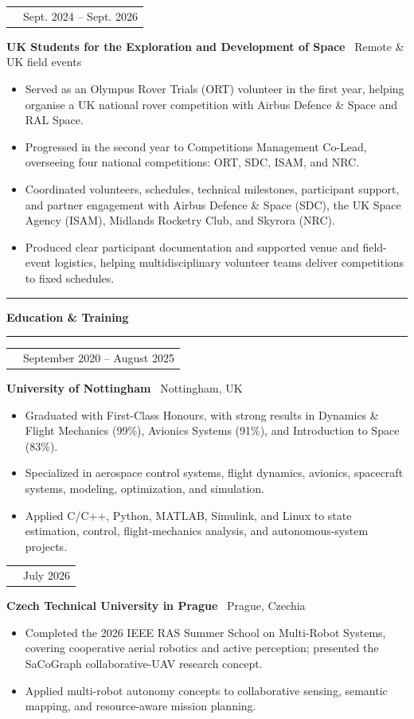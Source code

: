 \documentclass[10pt,a4paper]{article}
\makeatletter
\newcommand{\SectionSize}{11.5pt}
\newcommand{\RoleSize}{10.3pt}
\newcommand{\CompanySize}{9.6pt}
\newcommand{\DurationSize}{9pt}
\newcommand{\BodySize}{9.2pt}
\newcommand{\SectionLineSize}{12pt}
\newcommand{\RoleLineSize}{11.5pt}
\newcommand{\CompanyLineSize}{10.8pt}
\newcommand{\DurationLineSize}{9pt}
\newcommand{\BodyLineSize}{11pt}
\newcommand{\SectionBefore}{4pt}
\newcommand{\SectionLineToTitle}{0pt}
\newcommand{\SectionTitleToLine}{2pt}
\newcommand{\SectionLineToEntry}{0pt}
\newcommand{\EntryBefore}{0pt}
\newcommand{\RoleToCompany}{-5pt}
\newcommand{\CompanyToBullets}{3pt}
\newcommand{\EntryAfter}{6pt}
\newcommand{\BulletSpacing}{2pt}
\newcommand{\BulletBefore}{0pt}
\newcommand{\BulletIndent}{1.25em}
\newcommand{\SectionLineThickness}{1.5pt}
\newcommand{\SubsectionLineThickness}{0.4pt}
\newcommand{\DurationWidth}{4.5cm}
\newcommand{\CVSection}[1]{

    \vspace{\SectionBefore}


    \noindent
    \textcolor{CVBlack}{
        \rule{\textwidth}{\SectionLineThickness}
    }

    \vspace{\SectionLineToTitle}


    {\fontsize{\SectionSize}{\SectionLineSize}
    \selectfont
    \textbf{\textcolor{CVBlack}{#1}}}

    \vspace{\SectionTitleToLine}


    \noindent
    \textcolor{CVLightGray}{
        \rule{\textwidth}{\SubsectionLineThickness}
    }

    \vspace{\SectionLineToEntry}
}
\newcommand{\CVEntry}[5]{

    \vspace{\EntryBefore}


    \noindent
    \begin{tabularx}{\textwidth}{
        @{}
        >{\raggedright\arraybackslash}X
        >{\raggedleft\arraybackslash}p{\DurationWidth}
        @{}
    }

        {\fontsize{\RoleSize}{\RoleLineSize}
        \selectfont
        \textbf{\textcolor{CVBlack}{#1}}}
        &
        {\fontsize{\DurationSize}{\DurationLineSize}
        \selectfont
        \textcolor{CVGray}{#4}}

    \end{tabularx}

    \vspace{\RoleToCompany}


    \noindent
    {\fontsize{\CompanySize}{\CompanyLineSize}
    \selectfont
    \textbf{\textcolor{CVDarkGray}{#2}}
    \textcolor{CVGray}{\textbar\ #3}}

    \vspace{\CompanyToBullets}


    \begin{itemize}[
        leftmargin=\BulletIndent,
        itemsep=\BulletSpacing,
        topsep=\BulletBefore,
        parsep=0pt,
        partopsep=0pt
    ]
        #5
    \end{itemize}

    \vspace{\EntryAfter}
}
\newcommand{\CVBullet}[1]{
    \item
    {\fontsize{\BodySize}{\BodyLineSize}
    \selectfont
    \textcolor{CVDarkGray}{#1}}
}
\makeatother
\begin{document}
\CVEntry
{UKSEDS Volunteer}
{UK Students for the Exploration and Development of Space}
{Remote \& UK field events}
{Sept. 2024 -- Sept. 2026}
{
    \CVBullet{Served as an Olympus Rover Trials (ORT) volunteer in the first year, helping organise a UK national rover competition with Airbus Defence \& Space and RAL Space.}

    \CVBullet{Progressed in the second year to Competitions Management Co-Lead, overseeing four national competitions: ORT, SDC, ISAM, and NRC.}

    \CVBullet{Coordinated volunteers, schedules, technical milestones, participant support, and partner engagement with Airbus Defence \& Space (SDC), the UK Space Agency (ISAM), Midlands Rocketry Club, and Skyrora (NRC).}

    \CVBullet{Produced clear participant documentation and supported venue and field-event logistics, helping multidisciplinary volunteer teams deliver competitions to fixed schedules.}
}


\CVSection{Education \& Training}

\CVEntry
{MEng Aerospace Engineering -- First-Class Honours}
{University of Nottingham}
{Nottingham, UK}
{September 2020 -- August 2025}
{
    \CVBullet{Graduated with First-Class Honours, with strong results in Dynamics \& Flight Mechanics (99\%), Avionics Systems (91\%), and Introduction to Space (83\%).}

    \CVBullet{Specialized in aerospace control systems, flight dynamics, avionics, spacecraft systems, modeling, optimization, and simulation.}

    \CVBullet{Applied C/C++, Python, MATLAB, Simulink, and Linux to state estimation, control, flight-mechanics analysis, and autonomous-system projects.}
}

\CVEntry
{IEEE RAS Summer School on Multi-Robot Systems}
{Czech Technical University in Prague}
{Prague, Czechia}
{July 2026}
{
    \CVBullet{Completed the 2026 IEEE RAS Summer School on Multi-Robot Systems, covering cooperative aerial robotics and active perception; presented the SaCoGraph collaborative-UAV research concept.}

    \CVBullet{Applied multi-robot autonomy concepts to collaborative sensing, semantic mapping, and resource-aware mission planning.}
}
\end{document}
